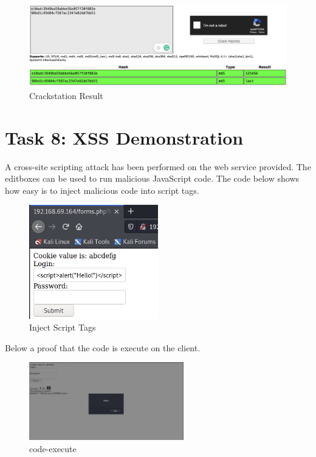 \begin{figure}[H]
  \centering
  \includegraphics[width=1\textwidth]{figures/crackstation}
  \caption{Crackstation Result}
  \label{f:crackstation}
\end{figure}


\section{Task 8: XSS Demonstration}
\label{task8-xss}
A cross-site scripting attack has been performed on the web service provided.
The editboxes can be used to run malicious JavaScript code.
The code below shows how easy is to inject malicious code into script tags.
\begin{figure}[H]
  \centering
  \includegraphics[width=0.5\textwidth]{figures/xss-demonstration}
  \caption{Inject Script Tags}
  \label{f:xss-demonstration}
\end{figure}

Below a proof that the code is execute on the client.

\begin{figure}[H]
  \centering
  \includegraphics[width=0.6\textwidth]{figures/code-execute}
  \caption{code-execute}
  \label{f:code-execute}
\end{figure}

